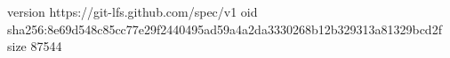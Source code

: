 version https://git-lfs.github.com/spec/v1
oid sha256:8e69d548c85cc77e29f2440495ad59a4a2da3330268b12b329313a81329bcd2f
size 87544
